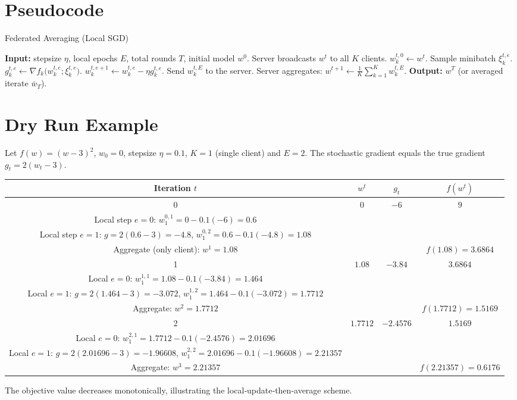 \documentclass{article}
\begin{document}
\section*{Pseudocode}
\begin{algorithm}[H]
\caption{Federated Averaging (Local SGD)}
\begin{algorithmic}[1]
\STATE \textbf{Input:} stepsize $\eta$, local epochs $E$, total rounds $T$, 
initial model $w^{0}$.
    \STATE Server broadcasts $w^{t}$ to all $K$ clients.
        \STATE $w_{k}^{t,0}\gets w^{t}$.
            \STATE Sample minibatch $\xi_{k}^{t,e}$.
            \STATE $g_{k}^{t,e}\gets \nabla f_k\!\bigl(w_{k}^{t,e};\xi_{k}^{t,e}\bigr)$.
            \STATE $w_{k}^{t,e+1}\gets w_{k}^{t,e}-\eta g_{k}^{t,e}$.
        \ENDFOR
        \STATE Send $w_{k}^{t,E}$ to the server.
    \ENDFOR
    \STATE Server aggregates: $w^{t+1}\gets \frac1K\sum_{k=1}^{K} w_{k}^{t,E}$.
\ENDFOR
\STATE \textbf{Output:} $w^{T}$ (or averaged iterate $\bar w_T$).
\end{algorithmic}
\end{algorithm}

\section*{Dry Run Example}
Let $f(w)=(w-3)^2$, $w_0=0$, stepsize $\eta=0.1$, $K=1$ (single client) and $E=2$.
The stochastic gradient equals the true gradient $g_t=2(w_t-3)$.

\begin{center}
\begin{tabular}{c|c|c|c}
Iteration $t$ & $w^{t}$ & $g_t$ & $f(w^{t})$\\ \hline
0 & $0$ & $-6$ & $9$\\
Local step $e=0$: $w_{1}^{0,1}=0-0.1(-6)=0.6$\\
Local step $e=1$: $g=2(0.6-3)=-4.8$, $w_{1}^{0,2}=0.6-0.1(-4.8)=1.08$\\
Aggregate (only client): $w^{1}=1.08$ &  &  & $f(1.08)=3.6864$\\ \hline
1 & $1.08$ & $-3.84$ & $3.6864$\\
Local $e=0$: $w_{1}^{1,1}=1.08-0.1(-3.84)=1.464$\\
Local $e=1$: $g=2(1.464-3)=-3.072$, $w_{1}^{1,2}=1.464-0.1(-3.072)=1.7712$\\
Aggregate: $w^{2}=1.7712$ &  &  & $f(1.7712)=1.5169$\\ \hline
2 & $1.7712$ & $-2.4576$ & $1.5169$\\
Local $e=0$: $w_{1}^{2,1}=1.7712-0.1(-2.4576)=2.01696$\\
Local $e=1$: $g=2(2.01696-3)=-1.96608$, $w_{1}^{2,2}=2.01696-0.1(-1.96608)=2.21357$\\
Aggregate: $w^{3}=2.21357$ &  &  & $f(2.21357)=0.6176$\\
\end{tabular}
\end{center}
The objective value decreases monotonically, illustrating the local‑update‑then‑average scheme.
\end{document}
